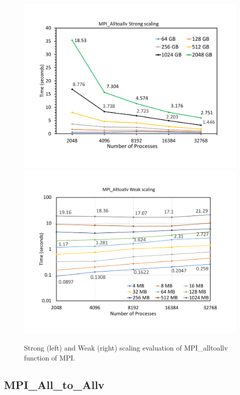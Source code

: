 


\begin{figure}[t]
	{\includegraphics[width=.50\textwidth,  trim={0cm 0cm 0cm 0cm, 
			clip}]{results/all_to_all_strong.pdf}}\hfill%
	{\includegraphics[width=.50\textwidth,  trim={0cm 0cm 0cm 0cm,
			clip}]{results/all_to_all_weak.pdf}}\hfill%
	\centering
	\caption{Strong (left) and Weak (right) scaling evaluation of MPI\_alltoallv function of MPI. }
	\label{fig:all_to_all}
\end{figure}


\subsection{MPI\_All\_to\_Allv}
\label{sec:all_to_all}


